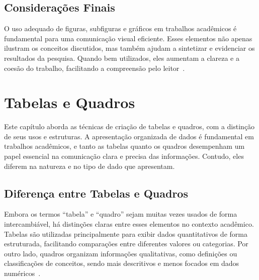 \documentclass[
    12pt
    ,oneside
    ,a4paper
    ,chapter=TITLE
    ,section=TITLE
    ,sumario=abnt-6027-2012]{abntex2}
\begin{document}
\section{Considerações Finais}

O uso adequado de figuras, subfiguras e gráficos em trabalhos acadêmicos é fundamental para uma comunicação visual eficiente. Esses elementos não apenas ilustram os conceitos discutidos, mas também ajudam a sintetizar e evidenciar os resultados da pesquisa. Quando bem utilizados, eles aumentam a clareza e a coesão do trabalho, facilitando a compreensão pelo leitor~\cite{tufte1990envisioning, knuth1984texbook}.






\chapter{Tabelas e Quadros}
\label{cap:tabelas}

Este capítulo aborda as técnicas de criação de tabelas e quadros, com a distinção de seus usos e estruturas. A apresentação organizada de dados é fundamental em trabalhos acadêmicos, e tanto as tabelas quanto os quadros desempenham um papel essencial na comunicação clara e precisa das informações. Contudo, eles diferem na natureza e no tipo de dado que apresentam.

\section{Diferença entre Tabelas e Quadros}

Embora os termos ``tabela'' e ``quadro'' sejam muitas vezes usados de forma intercambiável, há distinções claras entre esses elementos no contexto acadêmico. Tabelas são utilizadas principalmente para exibir dados quantitativos de forma estruturada, facilitando comparações entre diferentes valores ou categorias. Por outro lado, quadros organizam informações qualitativas, como definições ou classificações de conceitos, sendo mais descritivos e menos focados em dados numéricos~\cite{abnt2018}.
\end{document}
